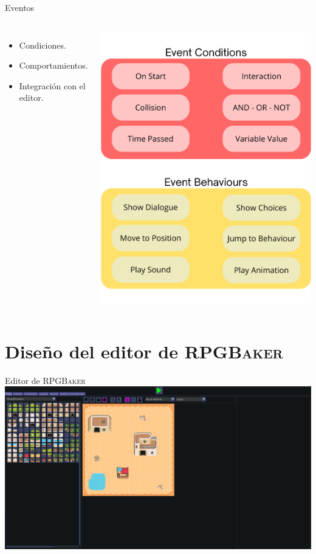 \documentclass[aspectratio=169]{beamer}
\newcommand{\baker}{%
	\textsc{RPGBaker}%
}
\begin{document}
\begin{frame}{Eventos}
	\begin{columns}
			\begin{itemize}
				\item Condiciones.
				\item Comportamientos.
				\item Integración con el editor.
			\end{itemize}
 				\includegraphics[height=0.85\textheight]{imgs/motor/Eventos.pdf}
	\end{columns}
\end{frame}
\section{Diseño del editor de \baker}
\begin{frame}{Editor de \baker}
	\includegraphics[width=\textwidth]{imgs/editor/editorMapas.pdf}
\end{frame}
\end{document}
